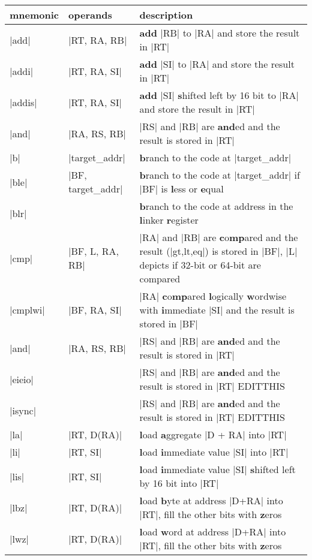 \begin{tabular}{l l p{9cm}}
    mnemonic & operands & description \\
    \hline
    |add| & |RT, RA, RB| & \textbf{add} |RB| to |RA| and store the result in |RT| \\
    |addi| & |RT, RA, SI| & \textbf{add} |SI| to |RA| and store the result in |RT| \\
    |addis| & |RT, RA, SI| & \textbf{add} |SI| \textbf{s}hifted left by 16 bit to |RA| and store the result in |RT| \\
    |and| & |RA, RS, RB| & |RS| and |RB| are \textbf{and}ed and the result is stored in |RT| \\
    |b| & |target_addr| & \textbf{b}ranch to the code at |target_addr|\\
    |ble| & |BF, target_addr| & \textbf{b}ranch to the code at |target_addr| if |BF| is \textbf{l}ess or \textbf{e}qual \\
    |blr| & & \textbf{b}ranch to the code at address in the \textbf{l}inker \textbf{r}egister \\
    |cmp| & |BF, L, RA, RB| & |RA| and |RB| are \textbf{c}o\textbf{mp}ared and the result (|gt,lt,eq|) is stored in |BF|, |L| depicts if 32-bit or 64-bit are compared \\
    |cmplwi| & |BF, RA, SI| & |RA| \textbf{c}o\textbf{mp}ared \textbf{l}ogically \textbf{w}ordwise with \textbf{i}mmediate |SI| and the result is stored in |BF|\\
    |and| & |RA, RS, RB| & |RS| and |RB| are \textbf{and}ed and the result is stored in |RT| \\
    |eieio| & & |RS| and |RB| are \textbf{and}ed and the result is stored in |RT| EDITTHIS\\
    |isync| & & |RS| and |RB| are \textbf{and}ed and the result is stored in |RT| EDITTHIS\\
    |la| & |RT, D(RA)| & \textbf{l}oad \textbf{a}ggregate |D + RA| into |RT|\\
    |li| & |RT, SI| & \textbf{l}oad \textbf{i}mmediate value |SI| into |RT|\\
    |lis| & |RT, SI| & \textbf{l}oad \textbf{i}mmediate value |SI| \textbf{s}hifted left by 16 bit into |RT|\\
    |lbz| & |RT, D(RA)| & \textbf{l}oad \textbf{b}yte at address |D+RA| into |RT|, fill the other bits with \textbf{z}eros \\
    |lwz| & |RT, D(RA)| & \textbf{l}oad \textbf{w}ord at address |D+RA| into |RT|, fill the other bits with \textbf{z}eros \\

\end{tabular}
